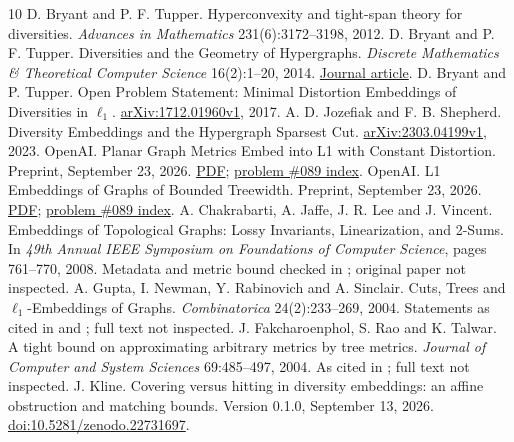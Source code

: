 \documentclass[11pt]{article}
\begin{document}
\begin{thebibliography}{10}
 D. Bryant and P. F. Tupper.
Hyperconvexity and tight-span theory for diversities.
\emph{Advances in Mathematics} 231(6):3172--3198, 2012.
 D. Bryant and P. F. Tupper.
Diversities and the Geometry of Hypergraphs.
\emph{Discrete Mathematics \& Theoretical Computer Science} 16(2):1--20, 2014.
\href{https://dmtcs.episciences.org/articles/2080}{Journal article}.
 D. Bryant and P. Tupper.
Open Problem Statement: Minimal Distortion Embeddings of Diversities in $\ell_1$.
\href{https://arxiv.org/abs/1712.01960v1}{arXiv:1712.01960v1}, 2017.
 A. D. Jozefiak and F. B. Shepherd.
Diversity Embeddings and the Hypergraph Sparsest Cut.
\href{https://arxiv.org/abs/2303.04199v1}{arXiv:2303.04199v1}, 2023.
 OpenAI.
Planar Graph Metrics Embed into L1 with Constant Distortion.
Preprint, September 23, 2026.
\href{https://github.com/openai/math/blob/main/preprints/Planar-Graph-Metrics-Embed-into-L1-with-Constant-Distortion-September-23-2026/paper.pdf}{PDF};
\href{https://github.com/openai/math/blob/main/lean/docs/089.md}{problem \#089 index}.
 OpenAI.
L1 Embeddings of Graphs of Bounded Treewidth.
Preprint, September 23, 2026.
\href{https://github.com/openai/math/blob/main/preprints/L1-Embeddings-of-Graphs-of-Bounded-Treewidth-September-23-2026/paper.pdf}{PDF};
\href{https://github.com/openai/math/blob/main/lean/docs/089.md}{problem \#089 index}.
 A. Chakrabarti, A. Jaffe, J. R. Lee and J. Vincent.
Embeddings of Topological Graphs: Lossy Invariants, Linearization, and 2-Sums.
In \emph{49th Annual IEEE Symposium on Foundations of Computer Science},
pages 761--770, 2008. Metadata and metric bound checked in \cite{OAIplanar,OAItw};
original paper not inspected.
 A. Gupta, I. Newman, Y. Rabinovich and A. Sinclair.
Cuts, Trees and $\ell_1$-Embeddings of Graphs.
\emph{Combinatorica} 24(2):233--269, 2004. Statements as cited in
\cite[Section 1.1]{OAIplanar} and \cite[Section 1]{OAItw}; full text not inspected.
 J. Fakcharoenphol, S. Rao and K. Talwar.
A tight bound on approximating arbitrary metrics by tree metrics.
\emph{Journal of Computer and System Sciences} 69:485--497, 2004.
As cited in \cite{BTopen}; full text not inspected.
 J. Kline.
Covering versus hitting in diversity embeddings: an affine obstruction and
matching bounds. Version 0.1.0, September 13, 2026.
\href{https://doi.org/10.5281/zenodo.22731697}{doi:10.5281/zenodo.22731697}.
\end{thebibliography}
\end{document}
